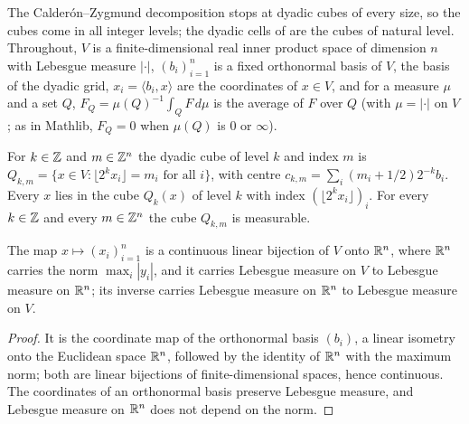 The Calder\'on--Zygmund decomposition stops at dyadic cubes of every size, so the cubes come in
all integer levels; the dyadic cells of  are the cubes of natural level.
Throughout, $V$ is a finite-dimensional real inner product space of dimension $n$ with Lebesgue
measure $|\cdot|$, $(b_i)_{i=1}^n$ is a fixed orthonormal basis of $V$, the basis of the dyadic
grid, $x_i = \langle b_i, x \rangle$ are the coordinates of $x \in V$, and for a measure $\mu$
and a set $Q$, $F_Q = \mu(Q)^{-1} \int_Q F \, d\mu$ is the average of $F$ over $Q$ (with
$\mu = |\cdot|$ on $V$; as in Mathlib, $F_Q = 0$ when $\mu(Q)$ is $0$ or $\infty$).

\begin{definition}
\label{def:dyadic-cubes}
\leanok
For $k \in \mathbb{Z}$ and $m \in \mathbb{Z}^n$ the dyadic cube of level $k$ and index $m$ is
$Q_{k,m} = \{x \in V : \lfloor 2^k x_i \rfloor = m_i \text{ for all } i\}$, with centre
$c_{k,m} = \sum_i (m_i + 1/2) 2^{-k} b_i$. Every $x$ lies in the cube $Q_k(x)$ of level $k$ with
index $(\lfloor 2^k x_i \rfloor)_i$. For every $k \in \mathbb{Z}$ and every $m \in \mathbb{Z}^n$ the cube
$Q_{k,m}$ is measurable.
\end{definition}

\begin{lemma}
\label{lem:grid-coordinates}
\leanok
{}
The map $x \mapsto (x_i)_{i=1}^n$ is a continuous linear bijection of $V$ onto $\mathbb{R}^n$, where
$\mathbb{R}^n$ carries the norm $\max_i |y_i|$, and it carries Lebesgue measure on $V$ to Lebesgue
measure on $\mathbb{R}^n$; its inverse carries Lebesgue measure on $\mathbb{R}^n$ to Lebesgue measure on $V$.
\end{lemma}

\begin{proof}
\leanok
It is the coordinate map of the orthonormal basis $(b_i)$, a linear isometry onto the Euclidean
space $\mathbb{R}^n$, followed by the identity of $\mathbb{R}^n$ with the maximum norm; both are linear bijections
of finite-dimensional spaces, hence continuous. The coordinates of an orthonormal basis preserve
Lebesgue measure, and Lebesgue measure on $\mathbb{R}^n$ does not depend on the norm.
\end{proof}

